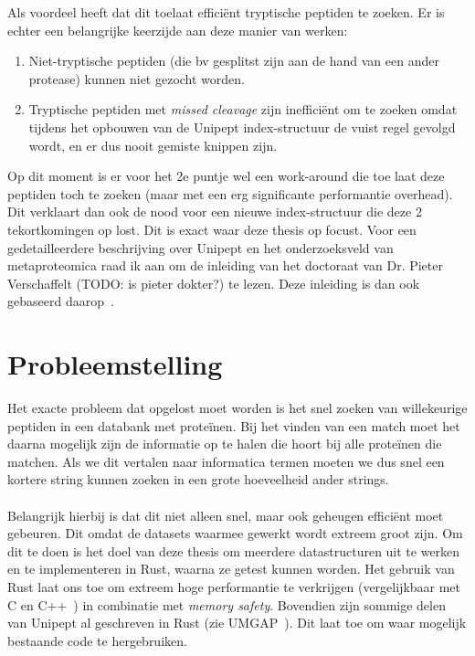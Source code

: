 \documentclass[11pt,dutch,faculty=we,layout=titlefont,underline=false,titleUppercase=true,titleUnderline=true]{ugent2016-report}
\begin{document}
    \leavevmode\newline
    Als voordeel heeft dat dit toelaat efficiënt tryptische peptiden te zoeken.
    Er is echter een belangrijke keerzijde aan deze manier van werken:
    \begin{enumerate}
        \item Niet-tryptische peptiden (die bv gesplitst zijn aan de hand van een ander protease) kunnen niet gezocht worden.
        \item Tryptische peptiden met \textit{missed cleavage} zijn inefficiënt om te zoeken omdat tijdens het opbouwen van de Unipept index-structuur de vuist regel gevolgd wordt, en er dus nooit gemiste knippen zijn.
    \end{enumerate}
    Op dit moment is er voor het 2e puntje wel een work-around die toe laat deze peptiden toch te zoeken (maar met een erg significante performantie overhead).
    Dit verklaart dan ook de nood voor een nieuwe index-structuur die deze 2 tekortkomingen op lost.
    Dit is exact waar deze thesis op focust.
    \newline
    Voor een gedetailleerdere beschrijving over Unipept en het onderzoeksveld van metaproteomica raad ik aan om de inleiding van het doctoraat van Dr. Pieter Verschaffelt (TODO: is pieter dokter?) te lezen.
    Deze inleiding is dan ook gebaseerd daarop~\cite{phdPieterUnipept}.

    \section{Probleemstelling}\label{sec:probleemstelling}
    Het exacte probleem dat opgelost moet worden is het snel zoeken van willekeurige peptiden in een databank met proteïnen.
    Bij het vinden van een match moet het daarna mogelijk zijn de informatie op te halen die hoort bij alle proteïnen die matchen.
    Als we dit vertalen naar informatica termen moeten we dus snel een kortere string kunnen zoeken in een grote hoeveelheid ander strings.
    \\ \\
    Belangrijk hierbij is dat dit niet alleen snel, maar ook geheugen efficiënt moet gebeuren.
    Dit omdat de datasets waarmee gewerkt wordt extreem groot zijn.
    Om dit te doen is het doel van deze thesis om meerdere datastructuren uit te werken en te implementeren in Rust, waarna ze getest kunnen worden.
    Het gebruik van Rust laat ons toe om extreem hoge performantie te verkrijgen (vergelijkbaar met C en C++~\cite{rustPerformantie}) in combinatie met \textit{memory safety}.
    Bovendien zijn sommige delen van Unipept al geschreven in Rust (zie UMGAP~\cite{UMGAP_paper, UMGAP_source}).
    Dit laat toe om waar mogelijk bestaande code te hergebruiken.
\end{document}
